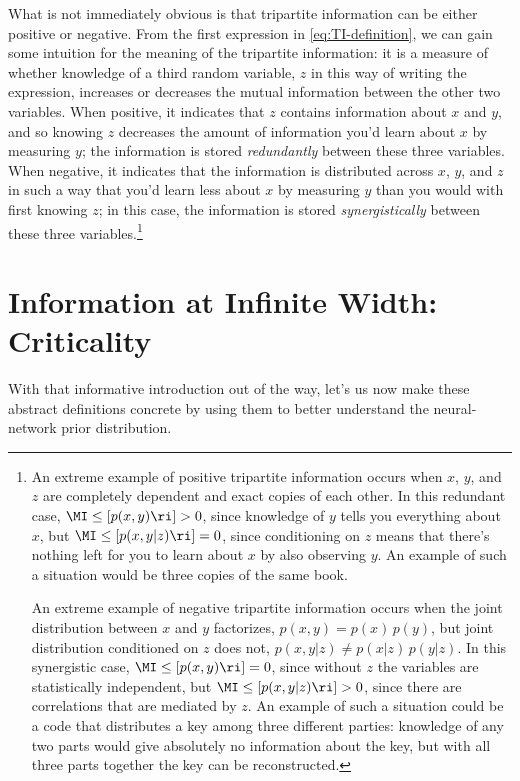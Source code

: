 What is not immediately obvious is that tripartite information can be either positive or negative. 
From the first expression in \eqref{eq:TI-definition}, we can gain some intuition for the meaning of the tripartite information: it is a measure of whether knowledge of a third random variable, $z$ in this way of writing the expression,
 increases or decreases the mutual information between the other two variables. When positive, it indicates that $z$ contains information about $x$ and $y$, and so knowing $z$ decreases the amount of information you'd learn about $x$ by measuring $y$; the information is stored \emph{redundantly} between these three variables. When negative, it indicates that the information is distributed across $x$, $y$, and $z$ in such a way that you'd learn less about $x$ by measuring $y$ than you would with first knowing $z$; in this case, the information is stored \emph{synergistically} between these three variables.\footnote{
An extreme example of positive tripartite information occurs when $x$, $y$, and $z$ are completely dependent and exact copies of each other. In this redundant case, $\MI\le[p(x, y)\ri]>0$, since knowledge of  $y$ tells you everything about $x$, but $\MI\le[p(x, y| z)\ri]=0$, since conditioning on $z$ means that there's nothing left for you to learn about $x$ by also observing $y$. An example of such a situation would be three copies of the same book.

An extreme example of negative tripartite information occurs when the joint distribution between $x$ and $y$ factorizes, $p(x,y)=p(x) \, p(y)$, but joint distribution conditioned on $z$ does not, $p(x, y|z) \neq p(x|z)\,p(y|z)$.  In this synergistic case,
$\MI\le[p(x, y)\ri]=0$, since without $z$ the variables are statistically independent, but $\MI\le[p(x, y| z)\ri]>0$, since there are correlations that are mediated by $z$. An example of such a situation could be a code that distributes a key among three different parties: knowledge of any two parts would give absolutely no information about the key, but with all three parts together the key can be reconstructed.}








\section{Information at Infinite Width: Criticality}\label{sec:information-infinite} 
With that informative introduction out of the way, let's us now make these abstract definitions concrete by using them to better understand the neural-network prior distribution.



